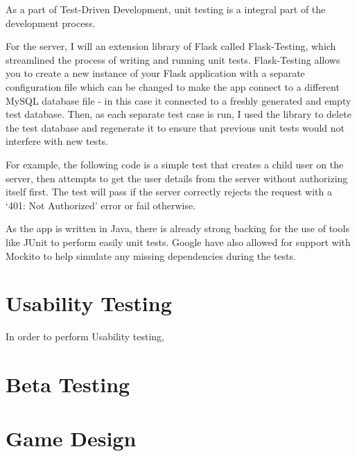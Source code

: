 As a part of Test-Driven Development, unit testing is a integral part of the development process.


For the server, I will an extension library of Flask called Flask-Testing, which streamlined the process of writing and running unit tests.
Flask-Testing allows you to create a new instance of your Flask application with a separate configuration file which can be changed to make the app connect to a different MySQL database file - in this case it connected to a freshly generated and empty test database.
Then, as each separate test case is run, I used the library to delete the test database and regenerate it to ensure that previous unit tests would not interfere with new tests.

For example, the following code is a simple test that creates a child user on the server, then attempts to get the user details from the server without authorizing itself first. 
The test will pass if the server correctly rejects the request with a `401: Not Authorized' error or fail otherwise.



As the app is written in Java, there is already strong backing for the use of tools like JUnit to perform easily unit tests.
Google have also allowed for support with Mockito to help simulate any missing dependencies during the tests.


\section{Usability Testing}
In order to perform Usability testing, 

\section{Beta Testing}

\section{Game Design}

